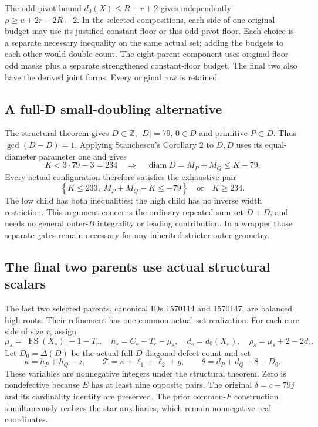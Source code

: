 \documentclass[11pt,a4paper]{article}
\theoremstyle{remark}
\newcommand{\FS}{\operatorname{FS}}
\newcommand{\Z}{\mathbb Z}
\begin{document}
The odd-pivot bound $d_0(X)\le R-r+2$ gives independently
$\rho\ge u+2r-2R-2$. In the selected compositions, each side of one
original budget may use its justified constant floor or this odd-pivot
floor. Each choice is a separate necessary inequality on the same
actual set; adding the budgets to each other would double-count.
The eight-parent component uses original-floor odd masks plus a
separate strengthened constant-floor budget. The final two also have
the derived joint forms. Every original row is retained.

\subsection{A full-D small-doubling alternative}
The structural theorem gives $D\subset\Z$, $|D|=79$, $0\in D$ and
primitive $P\subset D$. Thus $\gcd(D-D)=1$. Applying Stanchescu's
Corollary 2 to $D,D$ uses its equal-diameter parameter one and gives
\[
 K<3\cdot79-3=234\quad\Longrightarrow\quad
 \operatorname{diam}D=M_P+M_Q\le K-79.
\]
Every actual configuration therefore satisfies the exhaustive pair
\begin{equation}\label{u86:eq:87stanchsplit}
 \left\{K\le233,\ M_P+M_Q-K\le-79\right\}
 \quad\text{or}\quad K\ge234.
\end{equation}
The low child has both inequalities; the high child has no inverse
width restriction. This argument concerns the ordinary repeated-sum
set $D+D$, and needs no general outer-$B$ integrality or leading
contribution. In a wrapper those separate gates remain necessary for
any inherited stricter outer geometry.

\subsection{The final two parents use actual structural scalars}
The last two selected parents, canonical IDs 1570114 and 1570147, are
balanced high roots. Their refinement has one common actual-set
realization. For each core side of size $r$, assign
\[
 \mu_s=|\FS(X_s)|-1-T_r,\quad h_s=C_s-T_r-\mu_s,\quad
 d_s=d_0(X_s),\quad\rho_s=\mu_s+2-2d_s.
\]
Let $D_0=\Delta(D)$ be the actual full-$D$ diagonal-defect count and set
\[
 \kappa=h_P+h_Q-z,\qquad
 \mathcal T=\kappa+\ell_1+\ell_2+g,\qquad
 \theta=d_P+d_Q+8-D_0.
\]
These variables are nonnegative integers under the structural theorem.
Zero is nondefective because $E$ has at least nine opposite pairs.
The original $\delta=c-79j$ and its cardinality identity are preserved.
The prior common-$F$ construction simultaneously realizes the star
auxiliaries, which remain nonnegative real coordinates.
\end{document}
